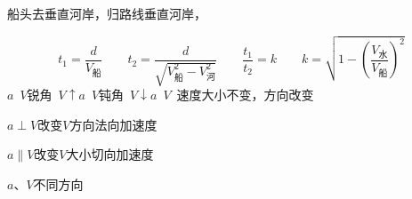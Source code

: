 船头去垂直河岸，归路线垂直河岸，

\[ t_1=\frac{d}{V_{\text{船}}}\qquad t_2=\frac{d}{\sqrt{V_{\text{船}}^{2}-V_{\text{河}}^{2}}}\qquad \frac{t_1}{t_2}=k\qquad k=\sqrt{1-\left(\frac{V_{\text{水}}}{V_{\text{船}}}\right)^{2}} \]
$a$\ $V$锐角\ $V\uparrow$\qquad $a$\ $V$钝角\ $V\downarrow$\qquad $a$\ $V$\ 速度大小不变，方向改变 %

$a\perp V$\quad 改变$V$方向\quad 法向加速度

$a\parallel V$\quad 改变$V$大小\quad 切向加速度

$a$、$V$不同方向

